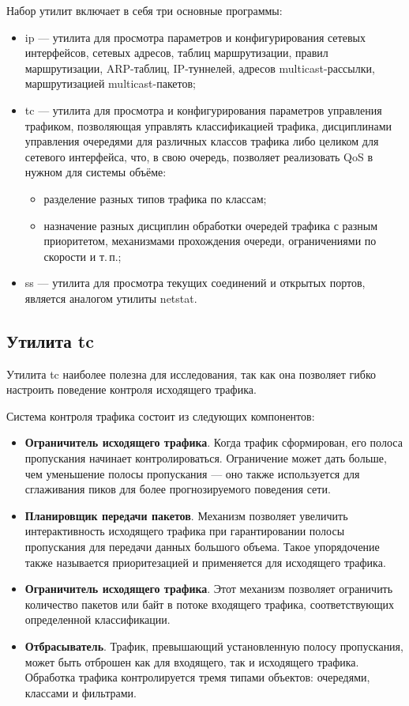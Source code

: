 Набор утилит включает в себя три основные программы:
\begin{itemize}
\item ip \cite{ip} --- утилита для просмотра параметров и
  конфигурирования сетевых интерфейсов, сетевых адресов, таблиц
  маршрутизации, правил маршрутизации, ARP-таблиц, IP-туннелей,
  адресов multicast-рассылки, маршрутизацией multicast-пакетов;
\item tc \cite{tc} --- утилита для просмотра и конфигурирования
  параметров управления трафиком, позволяющая управлять классификацией
  трафика, дисциплинами управления очередями для различных классов
  трафика либо целиком для сетевого интерфейса, что, в свою очередь,
  позволяет реализовать QoS в нужном для системы объёме:
  \begin{itemize}
  \item разделение разных типов трафика по классам;
  \item назначение разных дисциплин обработки очередей трафика с
    разным приоритетом, механизмами прохождения очереди, ограничениями
    по скорости и т.\,п.;
  \end{itemize}
\item ss \cite{ss} --- утилита для просмотра текущих соединений и
  открытых портов, является аналогом утилиты netstat.
\end{itemize}

\subsection{Утилита tc}

Утилита tc \cite{tc} наиболее полезна для исследования, так
как она позволяет гибко настроить поведение контроля исходящего трафика.

Система контроля трафика состоит из следующих компонентов:
\begin{itemize}
\item \textbf{Ограничитель исходящего трафика}. Когда трафик
  сформирован, его полоса пропускания начинает
  контролироваться. Ограничение может дать больше, чем уменьшение
  полосы пропускания --- оно также используется для сглаживания пиков
  для более прогнозируемого поведения сети.
\item \textbf{Планировщик передачи пакетов}. Механизм позволяет
  увеличить интерактивность исходящего трафика при гарантировании
  полосы пропускания для передачи данных большого объема. Такое
  упорядочение также называется приоритезацией и применяется для
  исходящего трафика.
\item \textbf{Ограничитель исходящего трафика}. Этот механизм
  позволяет ограничить количество пакетов или байт в потоке входящего
  трафика, соответствующих определенной классификации.
\item
  \textbf{Отбрасыватель}. Трафик, превышающий установленную полосу
  пропускания, может быть отброшен как для входящего, так и исходящего
  трафика. Обработка трафика контролируется тремя типами объектов:
  очередями, классами и фильтрами. 
\end{itemize}

